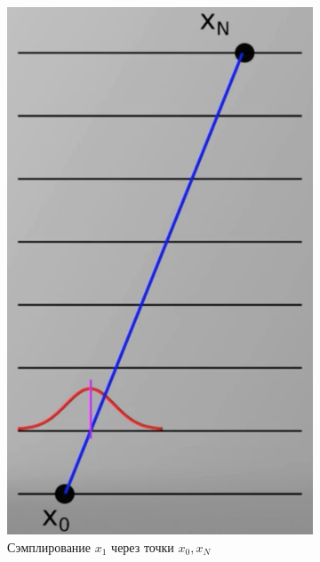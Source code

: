 \begin{lecture}
\begin{figure}[ht]
\begin{subfigure}{0.33\columnwidth}
            \includegraphics[width=\linewidth]{fig/x1-selection}
            \caption{Сэмплирование $x_1$ через точки $x_0, x_N$}
            \label{fig:x_1-levy_example}
        \end{subfigure}
        \begin{subfigure}{0.33\columnwidth}

\end{subfigure}
\end{figure}
\end{lecture}
